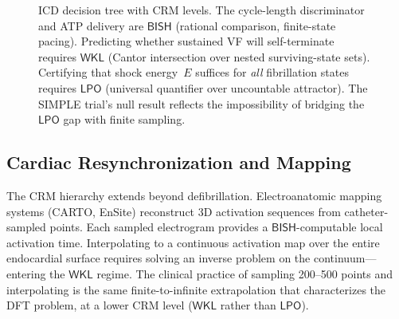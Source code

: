 \documentclass[11pt,a4paper]{article}
\theoremstyle{plain}
\theoremstyle{definition}
\newcommand{\BISH}{\textsf{BISH}}
\newcommand{\WKL}{\textsf{WKL}}
\newcommand{\LPO}{\textsf{LPO}}
\begin{document}
\begin{figure}[ht]
\caption{ICD decision tree with CRM levels.  The cycle-length discriminator and ATP delivery are $\BISH$ (rational comparison, finite-state pacing).  Predicting whether sustained VF will self-terminate requires $\WKL$ (Cantor intersection over nested surviving-state sets).  Certifying that shock energy~$E$ suffices for \emph{all} fibrillation states requires $\LPO$ (universal quantifier over uncountable attractor).  The SIMPLE trial's null result reflects the impossibility of bridging the $\LPO$ gap with finite sampling.}
\label{fig:icd}
\end{figure}

\subsection{Cardiac Resynchronization and Mapping}

The CRM hierarchy extends beyond defibrillation.  Electroanatomic mapping systems (CARTO, EnSite) reconstruct 3D activation sequences from catheter-sampled points.  Each sampled electrogram provides a $\BISH$-computable local activation time.  Interpolating to a continuous activation map over the entire endocardial surface requires solving an inverse problem on the continuum---entering the $\WKL$ regime.  The clinical practice of sampling 200--500 points and interpolating is the same finite-to-infinite extrapolation that characterizes the DFT problem, at a lower CRM level ($\WKL$ rather than $\LPO$).
\end{document}
